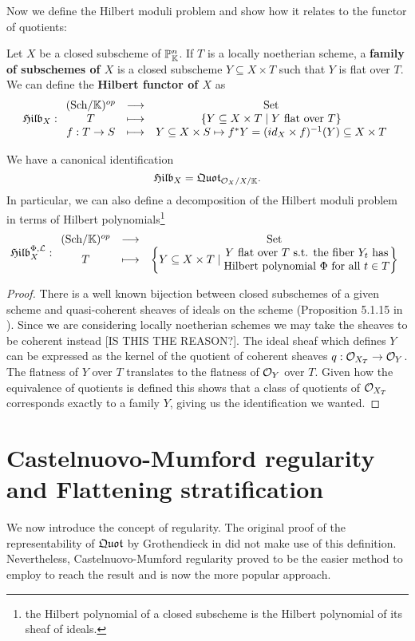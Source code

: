 Now we define the Hilbert moduli problem and show how it relates to the functor of quotients:

\begin{definition}
Let $X$ be a closed subscheme of $\mathbb{P}^n_{\mathbb{K}}$.
If $T$ is a locally noetherian scheme, a \textbf{family of subschemes of $X$} is a closed subscheme $Y\subseteq X\times T$ such that $Y$ is flat over $T$. 
We can define the \textbf{Hilbert functor of $X$} as
\[\mathfrak{Hilb}_{X}:\begin{array}{ccc} {({\mathrm{Sch}}/{\mathbb{K}})^{op}} & \longrightarrow & {\mathrm{Set}}\\ {T} & \longmapsto & {\left\{{Y\subseteq X\times T\mid Y\text{ flat over }T}\right\}}\\ {f:T\to S} & \longmapsto & {Y\subseteq X\times S\mapsto f^\ast Y=(id_{X}\times f)^{-1}(Y)\subseteq X\times T} \end{array}\]
\end{definition}

\begin{proposition}\label{HilbertIsAQuotScheme}
We have a canonical identification
\[\mathfrak{Hilb}_X=\mathfrak{Quot}_{\mathcal{O}_X/X/\mathbb{K}}.\]
In particular, we can also define a decomposition of the Hilbert moduli problem in terms of Hilbert polynomials\footnote{the Hilbert polynomial of a closed subscheme is the Hilbert polynomial of its sheaf of ideals.}
\[\mathfrak{Hilb}^{\Phi,\mathcal{L}}_{X}:\begin{array}{ccc} {({\mathrm{Sch}}/{\mathbb{K}})^{op}} & \longrightarrow & {\mathrm{Set}}\\ {T} & \longmapsto & {\left\{{Y\subseteq X\times T\mid \begin{matrix}Y\text{ flat over $T$ s.t. the fiber $Y_t$ has}\\\text{Hilbert polynomial $\Phi$ for all $t\in T$}\end{matrix}}\right\}} \end{array}\]
\end{proposition}
\begin{proof}
There is a well known bijection between closed subschemes of a given scheme and quasi-coherent sheaves of ideals on the scheme (Proposition 5.1.15 in \cite{QingLiu}). Since we are considering locally noetherian schemes we may take the sheaves to be coherent instead [IS THIS THE REASON?]. The ideal sheaf which defines $Y$ can be expressed as the kernel of the quotient of coherent sheaves $q:\mathcal{O}_{X_T}\to \mathcal{O}_Y$. The flatness of $Y$ over $T$ translates to the flatness of $\mathcal{O}_Y$ over $T$. Given how the equivalence of quotients is defined this shows that a class of quotients of $\mathcal{O}_{X_T}$ corresponds exactly to a family $Y$, giving us the identification we wanted.
\end{proof}

\section{Castelnuovo-Mumford regularity and Flattening stratification}

We now introduce the concept of regularity. The original proof of the representability of $\mathfrak{Quot}$ by Grothendieck in \cite{FGAVI} did not make use of this definition. Nevertheless, Castelnuovo-Mumford regularity proved to be the easier method to employ to reach the result and is now the more popular approach.

